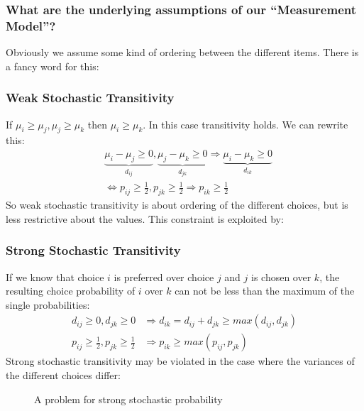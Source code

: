 \documentclass[../main/Notes.tex]{subfiles}
\begin{document}
\subsubsection*{What are the underlying assumptions of our ``Measurement Model''?}
Obviously we assume some kind of ordering between the different items. There is a fancy word for this:

\subsubsection{Weak Stochastic Transitivity}
If $\mu_i \geq \mu_j,\mu_j \geq \mu_k$ then $\mu_i \geq \mu_k$. In this case transitivity holds. We can rewrite this:
\begin{align*}
&\underbrace{\mu_i-\mu_j \geq 0}_{d_{ij}},\underbrace{\mu_j-\mu_k \geq 0}_{d_{jk}} \Rightarrow \underbrace{\mu_i-\mu_k \geq 0}_{d_{ik}}\\
&\Leftrightarrow p_{ij} \geq \frac{1}{2}, p_{jk} \geq \frac{1}{2} \Rightarrow p_{ik} \geq \frac{1}{2}
\end{align*}
So weak stochastic transitivity is about ordering of the different choices, but is less restrictive about the values. This constraint is exploited by:

\subsubsection{Strong Stochastic Transitivity}
If we know that choice $i$ is preferred over choice $j$ and $j$ is chosen over $k$, the resulting choice probability of $i$ over $k$ can not be less than the maximum of the single probabilities:
\begin{align*}
d_{ij} \geq 0, d_{jk} \geq 0 &\Rightarrow d_{ik} = d_{ij}+d_{jk} \geq max(d_{ij},d_{jk})\\
p_{ij} \geq \frac{1}{2}, p_{jk} \geq \frac{1}{2} &\Rightarrow p_{ik} \geq max(p_{ij},p_{jk})
\end{align*}
Strong stochastic transitivity may be violated in the case where the variances of the different choices differ:
\begin{figure}[htb]
  \centering
  \caption{A problem for strong stochastic probability}
  \label{fig:2014-07-07-strongStochTrans}
\end{figure}
\end{document}
